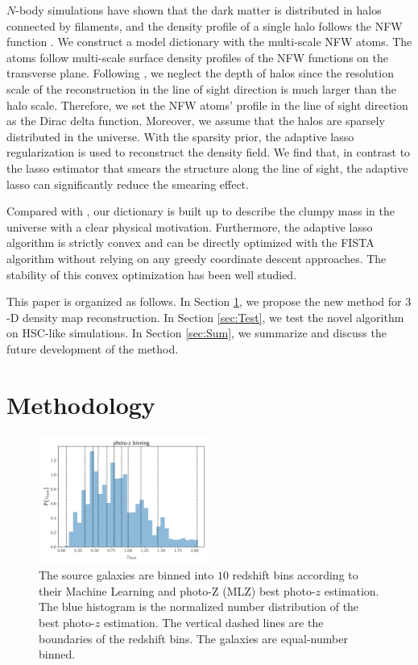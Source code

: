 \documentclass[twocolumn]{aastex62}
\begin{document}
$N$-body simulations have shown that the dark matter is distributed in halos
connected by filaments, and the density profile of a single halo follows the
NFW function \citep{halo-NFW1997ApJ}.  We construct a model dictionary with the
multi-scale NFW atoms.  The atoms follow multi-scale surface density profiles
of the NFW functions \citep{haloModel-TJ2003-3pt} on the transverse plane.
Following \citet{LSS-massMap-Glimpse3D-Leonard2014}, we neglect the depth of
halos since the resolution scale of the reconstruction in the line of sight
direction is much larger than the halo scale. Therefore, we set the NFW atoms'
profile in the line of sight direction as the Dirac delta function.  Moreover,
we assume that the halos are sparsely distributed in the universe.  With the
sparsity prior, the adaptive lasso regularization \citep{AdaLASSO-Zou2006} is
used to reconstruct the density field.  We find that, in contrast to the lasso
estimator that smears the structure along the line of sight, the adaptive lasso
can significantly reduce the smearing effect.

Compared with \citet{LSS-massMap-Glimpse3D-Leonard2014}, our dictionary is
built up to describe the clumpy mass in the universe with a clear physical
motivation. Furthermore, the adaptive lasso algorithm is strictly convex and
can be directly optimized with the FISTA algorithm \citep{FISTA-Beck2009}
without relying on any greedy coordinate descent approaches. The stability of
this convex optimization has been well studied.

This paper is organized as follows.
In Section \ref{sec:Method}, we propose the new method for $3$-D density map
reconstruction.
In Section \ref{sec:Test}, we test the novel algorithm on HSC-like simulations.
In Section \ref{sec:Sum}, we summarize and discuss the future development of
the method.

\section{Methodology}
\label{sec:Method}

\begin{figure}[!t]
 \centering
 \includegraphics[width=0.5\textwidth]{photo-z_binning.pdf}
 \caption{The source galaxies are binned into $10$ redshift bins according to
     their Machine Learning and photo-Z (MLZ) best photo-$z$ estimation. The
     blue histogram is the normalized number distribution of the best photo-$z$
     estimation. The vertical dashed lines are the boundaries of the redshift
     bins.  The galaxies are equal-number binned.
        } \label{fig_bestpz}
\end{figure}
\end{document}
